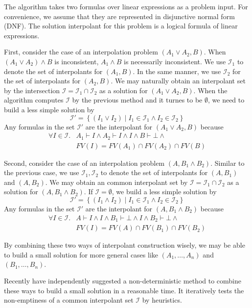 The algorithm takes two formulas over linear expressions as a problem
input.  For convenience, we assume that they are represented in
disjunctive normal form (DNF).  The solution interpolant for this
problem is a logical formula of linear expressions.

First, consider the case of an interpolation problem
$(A_1 \vee A_2, B)$.  When $(A_1 \vee A_2) \wedge B$ is inconsistent,
$A_1 \wedge B$ is necessarily inconsistent.  We use $\mathcal{I}_1$ to
denote the set of interpolants for $(A_1, B)$.  In the same manner, we
use $\mathcal{I}_2$ for the set of interpolants for $(A_2, B)$.  We
may naturally obtain an interpolant set by the intersection
$\mathcal{I} = \mathcal{I}_1 \cap \mathcal{I}_2$ as a solution for
$(A_1 \vee A_2, B)$.  When the algorithm computes $\mathcal{I}$ by the
previous method and it turnes to be $\emptyset$, we need to build a
less simple solution by
\[ \mathcal{I}' = \left\lbrace \left( I_1 \vee I_2 \right) \mid
I_1 \in \mathcal{I}_1 \wedge I_2 \in \mathcal{I}_2 \right\rbrace \]
Any formulas in the set $\mathcal{I}'$ are the interpolant for
$(A_1 \vee A_2, B)$ because
\begin{align*}
\forall I \in \mathcal{I}. & A_1 \vdash I \wedge A_2 \vdash I \wedge I \wedge B \vdash \bot \wedge \\
& FV(I) = FV(A_1) \cap FV(A_2) \cap FV(B)
\end{align*}

Second, consider the case of an interpolation problem
$(A, B_1 \wedge B_2)$.  Similar to the previous case, we use
$\mathcal{I}_1, \mathcal{I}_2$ to denote the set of interpolants for
$(A, B_1)$ and $(A, B_2)$.  We may obtain an common interpolant set by
$\mathcal{I} = \mathcal{I}_1 \cap \mathcal{I}_2$ as a solution for
$(A, B_1 \wedge B_2)$.  If $\mathcal{I} = \emptyset$, we build a less
simple solution by
\[ \mathcal{I}' = \left\lbrace \left( I_1 \wedge I_2 \right) \mid
I_1 \in \mathcal{I}_1 \wedge I_2 \in \mathcal{I}_2 \right\rbrace \]
Any formulas in the set $\mathcal{I}'$ are the interpolant for
$(A, B_1 \wedge B_2)$ because
\begin{align*}
\forall I \in \mathcal{I}. & A \vdash I \wedge I \wedge B_1 \vdash \bot \wedge I \wedge B_2 \vdash \bot \wedge \\
& FV(I) = FV(A) \cap FV(B_1) \cap FV(B_2)
\end{align*}

By combining these two ways of interpolant construction wisely, we may
be able to build a small solution for more general cases like
$(A_1, \ldots, A_n)$ and $(B_1, \ldots, B_n)$.

Recently \cite{conf/cav/AlbarghouthiM13} have independently suggested
a non-deterministic method to combine these ways to build a small
solution in a reasonable time.  It iteratively tests the non-emptiness
of a common interpolant set $\mathcal{I}$ by heuristics.
